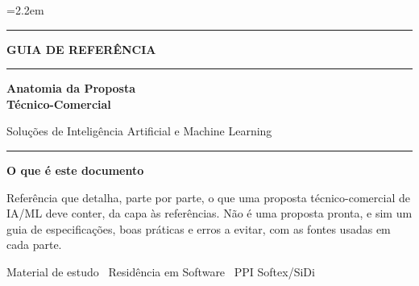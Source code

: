 \documentclass[11pt]{article}
\begin{document}
\color{textcol}
\emergencystretch=2.2em
\sloppy

\thispagestyle{empty}
\begin{center}
\vspace*{1.4cm}

{\setlength{\fboxsep}{0pt}\colorbox{accent}{\rule{1.1cm}{1.1cm}}}

\vspace{0.9cm}

{\displayfont\Large\bfseries\color{accent}GUIA DE REFERÊNCIA}

\vspace{0.7cm}

{\color{line}\rule{0.55\linewidth}{0.8pt}}

\vspace{0.7cm}

{\displayfont\fontsize{34}{40}\selectfont\bfseries\color{textcol}Anatomia da Proposta\\[6pt] \textcolor{accent}{Técnico-Comercial}}

\vspace{0.5cm}

{\displayfont\Large\color{accent}Soluções de Inteligência Artificial e Machine Learning}

\vspace{0.7cm}

{\color{line}\rule{0.55\linewidth}{0.8pt}}

\vspace{1.0cm}

\begin{tcolorbox}[enhanced,width=0.9\linewidth,colback=panel,colframe=line,
  boxrule=0.8pt,arc=4pt,left=18pt,right=18pt,top=14pt,bottom=14pt,
  borderline west={3pt}{0pt}{accent}]
  {\bfseries\color{accent}O que é este documento}\par
  \vspace{5pt}
  \color{textcol}Referência que detalha, parte por parte, o que uma proposta técnico-comercial de IA/ML deve conter, da capa às referências. Não é uma proposta pronta, e sim um guia de especificações, boas práticas e erros a evitar, com as fontes usadas em cada parte.
\end{tcolorbox}

\vfill
{\footnotesize\color{muted}Material de estudo \textcolor{line}{\textbar}\ Residência em Software \textcolor{line}{\textbar}\ PPI Softex/SiDi}
\vspace{0.6cm}
\end{center}
\end{document}
